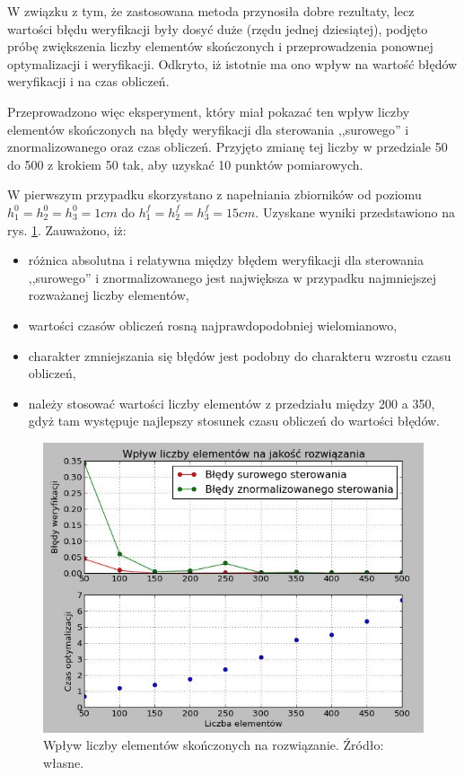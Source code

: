 W związku z tym, że zastosowana metoda przynosiła dobre rezultaty, lecz wartości błędu weryfikacji były dosyć duże (rzędu jednej dziesiątej), podjęto próbę zwiększenia liczby elementów skończonych i przeprowadzenia ponownej optymalizacji i weryfikacji. Odkryto, iż istotnie ma ono wpływ na wartość błędów weryfikacji i na czas obliczeń.

Przeprowadzono więc eksperyment, który miał pokazać ten wpływ liczby elementów skończonych na błędy weryfikacji dla sterowania ,,surowego'' i znormalizowanego oraz czas obliczeń. Przyjęto zmianę tej liczby w przedziale 50 do 500 z krokiem 50 tak, aby uzyskać 10 punktów pomiarowych.

W pierwszym przypadku skorzystano z napełniania zbiorników od poziomu $h_{1}^{0} = h_{2}^{0} = h_{3}^{0} = 1 cm$ do $h_{1}^{f} = h_{2}^{f} = h_{3}^{f} = 15 cm$. Uzyskane wyniki przedstawiono na rys. \ref{fig:elementsinfluence1-15_50-500}. Zauważono, iż:
\begin{itemize}
    \item różnica absolutna i relatywna między błędem weryfikacji dla sterowania ,,surowego'' i znormalizowanego jest największa w przypadku najmniejszej rozważanej liczby elementów,
    \item wartości czasów obliczeń rosną najprawdopodobniej wielomianowo,
    \item charakter zmniejszania się błędów jest podobny do charakteru wzrostu czasu obliczeń,
    \item należy stosować wartości liczby elementów z przedziału między 200 a 350, gdyż tam występuje najlepszy stosunek czasu obliczeń do wartości błędów.
\end{itemize}

\begin{figure}[ht]
    \centering
    \includegraphics{Grafika/elements_influence_1-15_50-500}
    \caption{Wpływ liczby elementów skończonych na rozwiązanie. Źródło: własne.}
    \label{fig:elementsinfluence1-15_50-500}
\end{figure}

